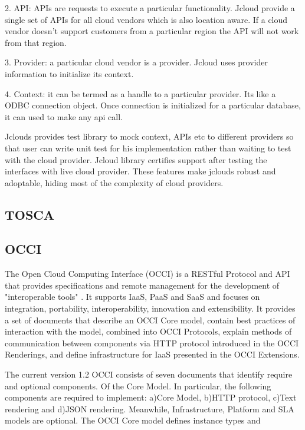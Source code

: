      2. API: APIs are requests to execute a particular
        functionality. Jcloud provide a single set of APIs for all
        cloud vendors which is also location aware. If a cloud vendor
        doesn’t support customers from a particular region the API
        will not work from that region.

     3. Provider: a particular cloud vendor is a provider. Jcloud uses
        provider information to initialize its context.

     4. Context: it can be termed as a handle to a particular
        provider. Its like a ODBC connection object. Once connection
        is initialized for a particular database, it can used to make
        any api call.

        Jclouds provides test library to mock context, APIs etc to
        different providers so that user can write unit test for his
        implementation rather than waiting to test with the cloud
        provider. Jcloud library certifies support after testing the
        interfaces with live cloud provider. These features make
        jclouds robust and adoptable, hiding most of the complexity of
        cloud providers.

\subsection{ TOSCA}


\subsection{ OCCI}

     The Open Cloud Computing Interface (OCCI) is a RESTful
     Protocol and API that provides specifications  and remote
     management for the development of "interoperable tools"
     \cite{www-occi}. It supports IaaS, PaaS and SaaS and
     focuses on integration, portability, interoperability,
     innovation and extensibility. It provides a set of documents
     that describe an OCCI Core model, contain best practices
     of interaction with the model, combined into OCCI Protocols,
     explain methods of communication between components via
     HTTP protocol introduced in the OCCI Renderings, and
     define infrastructure for IaaS presented in the OCCI
     Extensions.

     The current version 1.2 OCCI consists of seven documents that
     identify require and optional components. Of the Core Model.  In
     particular, the following components are required to implement:
     a)Core Model, b)HTTP protocol, c)Text rendering and d)JSON
     rendering. Meanwhile, Infrastructure, Platform and SLA models are
     optional.  The OCCI Core model defines instance types and

